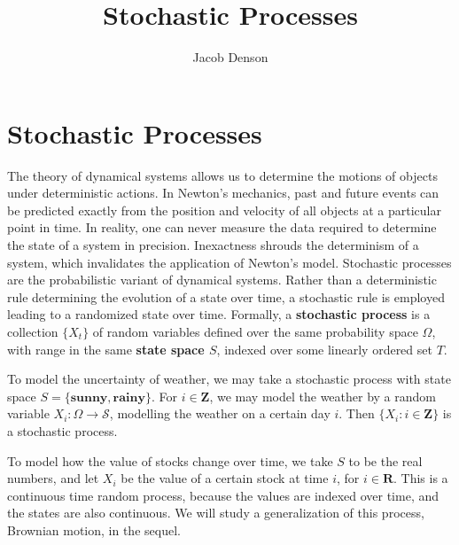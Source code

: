 

\title{Stochastic Processes}
\author{Jacob Denson}



\maketitle
\tableofcontents
{}

\chapter{Stochastic Processes}

The theory of dynamical systems allows us to determine the motions of objects under deterministic actions. In Newton's mechanics, past and future events can be predicted exactly from the position and velocity of all objects at a particular point in time. In reality, one can never measure the data required to determine the state of a system in precision. Inexactness shrouds the determinism of a system, which invalidates the application of Newton's model. Stochastic processes are the probabilistic variant of dynamical systems. Rather than a deterministic rule determining the evolution of a state over time, a stochastic rule is employed leading to a randomized state over time. Formally, a {\bf stochastic process} is a collection $\{ X_t \}$ of random variables defined over the same probability space $\Omega$, with range in the same {\bf state space $S$}, indexed over some linearly ordered set $T$.

\begin{example}
    To model the uncertainty of weather, we may take a stochastic process with state space $S = \{ \textbf{sunny}, \textbf{rainy} \}$. For $i \in \mathbf{Z}$, we may model the weather by a random variable $X_i : \Omega \to \mathcal{S}$, modelling the weather on a certain day $i$. Then $\{ X_i : i \in \mathbf{Z} \}$ is a stochastic process.
\end{example}

\begin{example}
    To model how the value of stocks change over time, we take $S$ to be the real numbers, and let $X_i$ be the value of a certain stock at time $i$, for $i \in \mathbf{R}$. This is a continuous time random process, because the values are indexed over time, and the states are also continuous. We will study a generalization of this process, Brownian motion, in the sequel.
\end{example}

